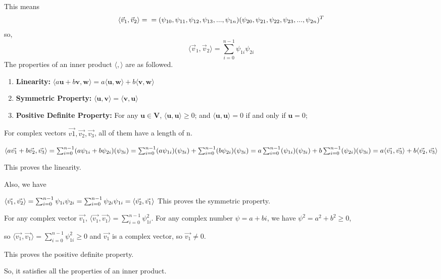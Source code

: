 \documentclass{article}
\begin{document}
\begin{enumerate}
          This means
          \[
              \langle \vec{v}_1,\vec{v}_2 \rangle=\\=(\psi_{10},\psi_{11},\psi_{12},\psi_{13},...,\psi_{1n})(\psi_{20},\psi_{21},\psi_{22},\psi_{23},...,\psi_{2n})^T
          \]
          so,
          \[\langle \vec{v}_1,\vec{v}_2 \rangle=\sum_{i=0}^{n-1}\psi_{1i}\psi_{2i}\]
          The properties of an inner product $\langle,\rangle$ are as followed\cite{ref1}.
          \begin{enumerate}
              \item \textbf{Linearity:} $\langle a\mathbf{u}+b\mathbf{v},\mathbf{w}\rangle=a\langle \mathbf{u,w}\rangle+b\langle \mathbf{v,w}\rangle$
              \item \textbf{Symmetric Property: }$\langle \mathbf{u,v}\rangle=\langle \mathbf{v,u}\rangle$
              \item \textbf{Positive Definite Property: } For any $\mathbf{u\in V}$, $\langle \mathbf{u,u}\rangle\geq0$;
                    and $\langle \mathbf{u,u}\rangle=0$ if and only if $\mathbf{u}=0$;
          \end{enumerate}
          For complex vectors $\vec{v1},\vec{v_2},\vec{v_3}$, all of them have a length of n.

          $\langle a\vec{v_1}+b\vec{v_2},\vec{v_3}\rangle
              \\=\sum_{i=0}^{n-1}(a\psi_{1i}+b\psi_{2i})(\psi_{3i})
              \\=\sum_{i=0}^{n-1}(a\psi_{1i})(\psi_{3i})+\sum_{i=0}^{n-1}(b\psi_{2i})(\psi_{3i})
              \\=a\sum_{i=0}^{n-1}(\psi_{1i})(\psi_{3i})+b\sum_{i=0}^{n-1}(\psi_{2i})(\psi_{3i})
              \\=a\langle\vec{v_1},\vec{v_3}\rangle+b\langle\vec{v_2},\vec{v_3}\rangle
          $

          This proves the linearity.

          Also, we have

          $\langle \vec{v_1},\vec{v_2}\rangle
              \\=\sum_{i=0}^{n-1}\psi_{1i}\psi_{2i}
              \\=\sum_{i=0}^{n-1}\psi_{2i}\psi_{1i}
              \\=\langle\vec{v_2},\vec{v_1}\rangle
          $
          This proves the symmetric property.

          For any complex vector $\vec{v_1}$, $\langle \vec{v_1},\vec{v_1}\rangle=\sum_{i=0}^{n-1}\psi_{1i}^2$.
          For any complex number $\psi=a+bi$, we have $\psi^2=a^2+b^2\geq0$,

          so $\langle \vec{v_1},\vec{v_1}\rangle=\sum_{i=0}^{n-1}\psi_{1i}^2\geq0$ and $\vec{v_1}$ is a complex vector, so $\vec{v_1}\neq0$.

          This proves the positive definite property.

          So, it satisfies all the properties of an inner product.
\end{enumerate}
\end{document}
